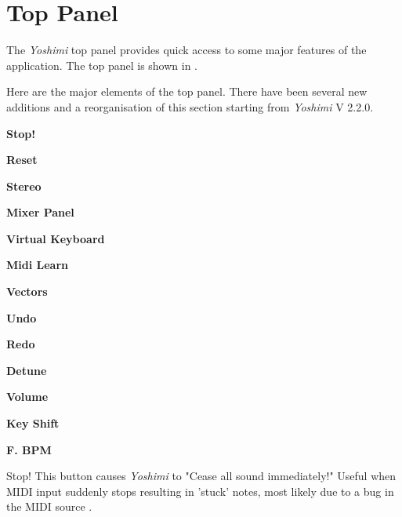 %
%
%

\section{Top Panel}
\label{sec:top_panel}

   The \textsl{Yoshimi} top panel provides quick access to some major
   features of the application.
   The top panel is shown in
   .

   Here are the major elements of the top panel. There have been several
   new additions and a reorganisation of this section starting from
   \textsl{Yoshimi} V 2.2.0.

   \begin{enumber}
      \item \textbf{Stop!}
      \item \textbf{Reset}
      \item \textbf{Stereo}
      \item \textbf{Mixer Panel}
      \item \textbf{Virtual Keyboard}
      \item \textbf{Midi Learn}
      \item \textbf{Vectors}
      \item \textbf{Undo}
      \item \textbf{Redo}
      \item \textbf{Detune}
      \item \textbf{Volume}
      \item \textbf{Key Shift}
      \item \textbf{F. BPM}
   \end{enumber}

   \setcounter{ItemCounter}{0}      %

   Stop!
   This button causes \textsl{Yoshimi} to
   "Cease all sound immediately!"
   Useful when MIDI input suddenly stops resulting in 'stuck' notes, most
   likely due to a bug in the MIDI source .

